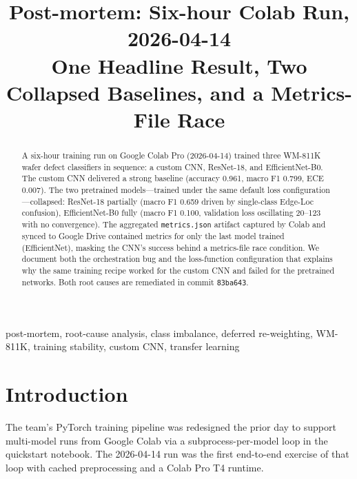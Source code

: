 \documentclass[conference]{IEEEtran}
\begin{document}
\title{Post-mortem: Six-hour Colab Run, 2026-04-14\\
\large{One Headline Result, Two Collapsed Baselines, and a Metrics-File Race}}

\author{
}

\maketitle

\begin{abstract}
A six-hour training run on Google Colab Pro (2026-04-14) trained three
WM-811K wafer defect classifiers in sequence: a custom CNN, ResNet-18, and
EfficientNet-B0. The custom CNN delivered a strong baseline (accuracy 0.961,
macro F1 0.799, ECE 0.007). The two pretrained models---trained under the
same default loss configuration---collapsed: ResNet-18 partially (macro F1
0.659 driven by single-class Edge-Loc confusion), EfficientNet-B0 fully
(macro F1 0.100, validation loss oscillating 20--123 with no convergence).
The aggregated \texttt{metrics.json} artifact captured by Colab and synced
to Google Drive contained metrics for only the last model trained
(EfficientNet), masking the CNN's success behind a metrics-file
race condition. We document both the orchestration bug and the loss-function
configuration that explains why the same training recipe worked for the
custom CNN and failed for the pretrained networks. Both root causes are
remediated in commit \texttt{83ba643}.
\end{abstract}

\begin{IEEEkeywords}
post-mortem, root-cause analysis, class imbalance, deferred re-weighting,
WM-811K, training stability, custom CNN, transfer learning
\end{IEEEkeywords}

\section{Introduction}
The team's PyTorch training pipeline was redesigned the prior day to
support multi-model runs from Google Colab via a subprocess-per-model loop
in the quickstart notebook. The 2026-04-14 run was the first end-to-end
exercise of that loop with cached preprocessing and a Colab Pro T4 runtime.
\end{document}
